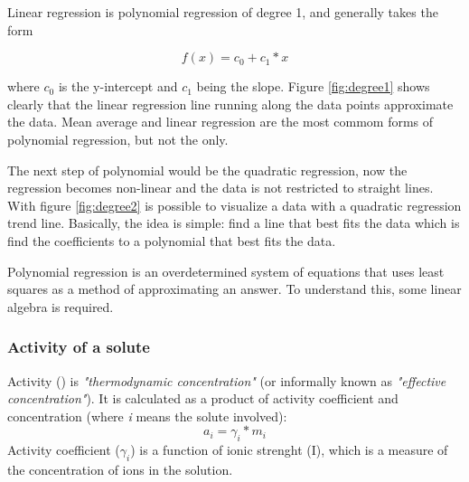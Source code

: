 \documentclass[ppgc,mestrado,english]{iiufrgs}
\begin{document}

Linear regression is polynomial regression of degree 1, and generally takes the form

\begin{equation} \label{eq:polynomialFormSmall}
f(x) = c_0 + c_1 * x
\end{equation}

where \emph{$c_0$} is the y-intercept and \emph{$c_1$} being the slope. Figure \ref{fig:degree1} shows clearly that the linear regression line running along the data points approximate the data. Mean average and linear regression are the most commom forms of polynomial regression, but not the only.


The next step of polynomial would be the quadratic regression, now the regression becomes non-linear and the data is not restricted to straight lines. With figure \ref{fig:degree2} is possible to visualize a data with a quadratic regression trend line. Basically, the idea is simple: find a line that best fits 
the data which is find the coefficients to a polynomial that best fits the data.


Polynomial regression is an overdetermined system of equations that uses least squares as a method of approximating an answer. To understand this, some linear algebra is required. 


\subsubsection{Activity of a solute}
Activity () is \emph{"thermodynamic concentration"} (or informally known as \emph{"effective concentration"}). It is calculated as a product of activity coefficient and concentration (where \emph{i} means the solute involved):
\begin{equation}\label{activityEq}
a_i = \gamma_i * m_i
\end{equation}
Activity coefficient ($\gamma_i$) is a function of ionic strenght (I), which is a measure of the concentration of ions in the solution.  
\end{document}
